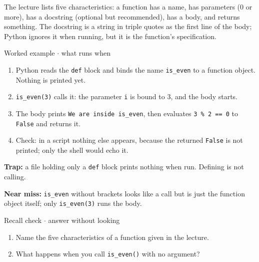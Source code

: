 \documentclass[11pt]{article}
\begin{document}
\begin{keepsection}
The lecture lists five characteristics: a function has a name, has parameters (0 or more), has a docstring (optional but recommended), has a body, and returns something. The docstring is a string in triple quotes as the first line of the body; Python ignores it when running, but it is the function’s specification.

\begin{workedbox}{Worked example \ensuremath{\cdot} what runs when}
\begin{enumerate}
\item Python reads the \texttt{def} block and binds the name \texttt{is\_even} to a function object. Nothing is printed yet.
\item \texttt{is\_even(3)} calls it: the parameter \texttt{i} is bound to 3, and the body starts.
\item The body prints \texttt{We are inside is\_even}, then evaluates \texttt{3 \% 2 == 0} to \texttt{False} and returns it.
\item Check: in a script nothing else appears, because the returned \texttt{False} is not printed; only the shell would echo it.
\end{enumerate}
\end{workedbox}

\begin{notebox}\textbf{Trap:} a file holding only a \texttt{def} block prints nothing when run. Defining is not calling.\end{notebox}

\begin{notebox}\textbf{Near miss:} \texttt{is\_even} without brackets looks like a call but is just the function object itself; only \texttt{is\_even(3)} runs the body.\end{notebox}

\begin{recallbox}{Recall check \ensuremath{\cdot} answer without looking}
\begin{enumerate}
\item Name the five characteristics of a function given in the lecture.
\item What happens when you call \texttt{is\_even()} with no argument?
\end{enumerate}

\end{recallbox}
\end{keepsection}
\end{document}
